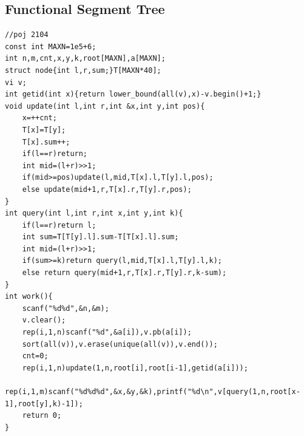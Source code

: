 \documentclass[twoside]{article}
\begin{document}
\subsection{Functional Segment Tree}
\begin{lstlisting}
//poj 2104
const int MAXN=1e5+6;
int n,m,cnt,x,y,k,root[MAXN],a[MAXN];
struct node{int l,r,sum;}T[MAXN*40];
vi v;
int getid(int x){return lower_bound(all(v),x)-v.begin()+1;}
void update(int l,int r,int &x,int y,int pos){
    x=++cnt;
    T[x]=T[y];
    T[x].sum++;
    if(l==r)return;
    int mid=(l+r)>>1;
    if(mid>=pos)update(l,mid,T[x].l,T[y].l,pos);
    else update(mid+1,r,T[x].r,T[y].r,pos);
}
int query(int l,int r,int x,int y,int k){
    if(l==r)return l;
    int sum=T[T[y].l].sum-T[T[x].l].sum;
    int mid=(l+r)>>1;
    if(sum>=k)return query(l,mid,T[x].l,T[y].l,k);
    else return query(mid+1,r,T[x].r,T[y].r,k-sum);
}
int work(){
    scanf("%d%d",&n,&m);
    v.clear();
    rep(i,1,n)scanf("%d",&a[i]),v.pb(a[i]);
    sort(all(v)),v.erase(unique(all(v)),v.end());
    cnt=0;
    rep(i,1,n)update(1,n,root[i],root[i-1],getid(a[i]));
    rep(i,1,m)scanf("%d%d%d",&x,&y,&k),printf("%d\n",v[query(1,n,root[x-1],root[y],k)-1]);
    return 0;
}

\end{lstlisting}
\end{document}
